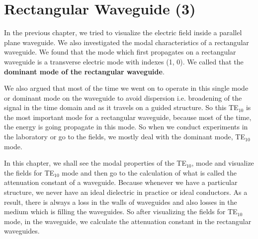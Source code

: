 \chapter{Rectangular Waveguide (3)}
In the previous chapter, we tried to visualize the electric field inside a parallel plane waveguide. We also investigated the modal characteristics of a rectangular waveguide. We found that the mode which first propagates on a rectangular waveguide is a transverse electric mode with indexes (1, 0). We called that the \textbf{dominant mode of the rectangular waveguide}. 
	
We also argued that most of the time we went on to operate in this single mode or dominant mode on the waveguide to avoid dispersion i.e. broadening of the signal in the time domain and as it travels on a guided structure. So this TE$_{10}$  is the most important mode for a rectangular waveguide, because most of the time, the energy is going propagate in this mode. So when we conduct experiments in the laboratory or go to the fields, we mostly deal with the dominant mode,  TE$_{10}$ mode.

In this chapter, we shall see the modal properties of the TE$_{10}$, mode and visualize the fields for TE$_{10}$ mode and then go to the calculation of what is called the attenuation constant of a waveguide. Because whenever we have a particular structure, we never have an ideal dielectric in practice or ideal conductors. As a result, there is always a loss in the walls of waveguides and also losses in the medium which is filling the waveguides. So after visualizing the fields for TE$_{10}$ mode, in the waveguide, we calculate the attenuation constant in the rectangular waveguides.

